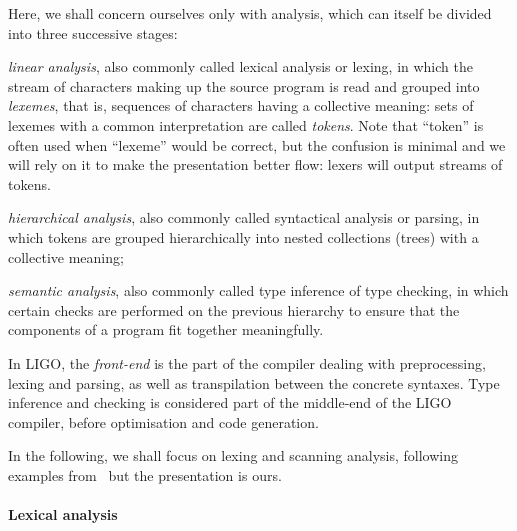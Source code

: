 \documentclass[12pt,a4paper]{article}
\begin{document}
Here, we shall concern ourselves only with analysis, which can itself
be divided into three successive stages:
\begin{enumerate*}

  \item \emph{linear analysis}, also commonly called lexical analysis
    or lexing, in which the stream of characters making up the source
    program is read and grouped into \emph{lexemes}, that is,
    sequences of characters having a collective meaning: sets of
    lexemes with a common interpretation are called \emph{tokens}.
    Note that ``token'' is often used when ``lexeme'' would be
    correct, but the confusion is minimal and we will rely on it to
    make the presentation better flow: lexers will output streams of
    tokens.

  \item \emph{hierarchical analysis}, also commonly called syntactical
    analysis or parsing, in which tokens are grouped hierarchically
    into nested collections (trees) with a collective meaning;

  \item \emph{semantic analysis}, also commonly called type inference
    of type checking, in which certain checks are performed on the
    previous hierarchy to ensure that the components of a program fit
    together meaningfully.

\end{enumerate*}

In LIGO, the \emph{front\hyp{}end} is the part of the compiler dealing
with preprocessing, lexing and parsing, as well as transpilation
between the concrete syntaxes. Type inference and checking is
considered part of the middle\hyp{}end of the LIGO compiler, before
optimisation and code generation.

In the following, we shall focus on lexing and scanning analysis,
following examples from~\cite{Dragon_1986} but the presentation is
ours.

\paragraph{Lexical analysis}
\end{document}
